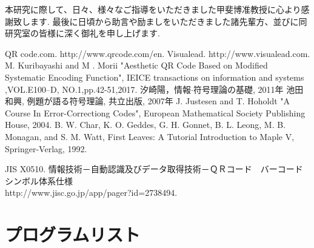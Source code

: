\documentclass{thesis}
\begin{document}
\acknowledgement

本研究に際して、日々、様々なご指導をいただきました甲斐博准教授に心より感謝致します.
最後に日頃から助言や励ましをいただきました諸先輩方、並びに同研究室の皆様に深く御礼を申し上げます.


\begin{thebibliography}{99}

%
QR code.com. http://www.qrcode.com/en.
%
Visualead. http://www.visualead.com.
%
M. Kuribayashi and M . Morii "Aesthetic QR Code Based on Modified Systematic Encoding Function",
IEICE transactions on information and systems ,VOL.E100–D, NO.1,pp.42-51,2017.
%
汐崎陽，情報$\cdot$符号理論の基礎, 2011年
%
池田和興, 例題が語る符号理論, 共立出版, 2007年
%
J. Justesen and T. Hoholdt "A Course In Error-Correctiong Codes",
European Mathematical Society Publishing House, 2004.
%
B. W. Char, K. O. Geddes, G. H. Gonnet, B. L. Leong, M. B. Monagan, and S. M. Watt,
First Leaves: A Tutorial Introduction to Maple V, Springer-Verlag, 1992. 
%
%

JIS X0510. 	情報技術－自動認識及びデータ取得技術－ＱＲコード　バーコードシンボル体系仕様\\http://www.jisc.go.jp/app/pager?id=2738494. 
\end{thebibliography}

\appendix

\chapter{プログラムリスト}
\end{document}

